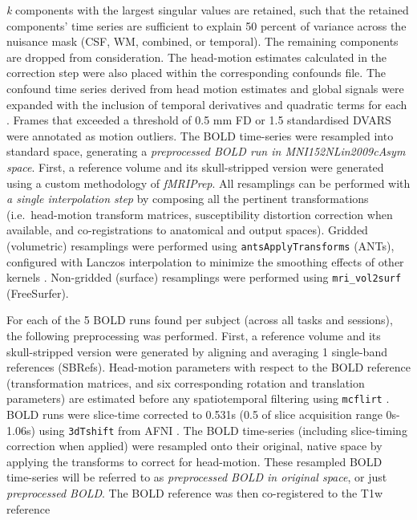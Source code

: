\documentclass[
]{article}
\begin{document}
\begin{description}
\emph{k} components with the largest singular values are retained, such
that the retained components' time series are sufficient to explain 50
percent of variance across the nuisance mask (CSF, WM, combined, or
temporal). The remaining components are dropped from consideration. The
head-motion estimates calculated in the correction step were also placed
within the corresponding confounds file. The confound time series
derived from head motion estimates and global signals were expanded with
the inclusion of temporal derivatives and quadratic terms for each
\citep{confounds_satterthwaite_2013}. Frames that exceeded a threshold
of 0.5 mm FD or 1.5 standardised DVARS were annotated as motion
outliers. The BOLD time-series were resampled into standard space,
generating a \emph{preprocessed BOLD run in MNI152NLin2009cAsym space}.
First, a reference volume and its skull-stripped version were generated
using a custom methodology of \emph{fMRIPrep}. All resamplings can be
performed with \emph{a single interpolation step} by composing all the
pertinent transformations (i.e.~head-motion transform matrices,
susceptibility distortion correction when available, and
co-registrations to anatomical and output spaces). Gridded (volumetric)
resamplings were performed using \texttt{antsApplyTransforms} (ANTs),
configured with Lanczos interpolation to minimize the smoothing effects
of other kernels \citep{lanczos}. Non-gridded (surface) resamplings were
performed using \texttt{mri\_vol2surf} (FreeSurfer).
\item[Functional data preprocessing]
For each of the 5 BOLD runs found per subject (across all tasks and
sessions), the following preprocessing was performed. First, a reference
volume and its skull-stripped version were generated by aligning and
averaging 1 single-band references (SBRefs). Head-motion parameters with
respect to the BOLD reference (transformation matrices, and six
corresponding rotation and translation parameters) are estimated before
any spatiotemporal filtering using \texttt{mcflirt} \citep[FSL
6.0.5.1:57b01774,][]{mcflirt}. BOLD runs were slice-time corrected to
0.531s (0.5 of slice acquisition range 0s-1.06s) using \texttt{3dTshift}
from AFNI \citep[RRID:SCR\_005927]{afni}. The BOLD time-series
(including slice-timing correction when applied) were resampled onto
their original, native space by applying the transforms to correct for
head-motion. These resampled BOLD time-series will be referred to as
\emph{preprocessed BOLD in original space}, or just \emph{preprocessed
BOLD}. The BOLD reference was then co-registered to the T1w reference

\end{description}
\end{document}
